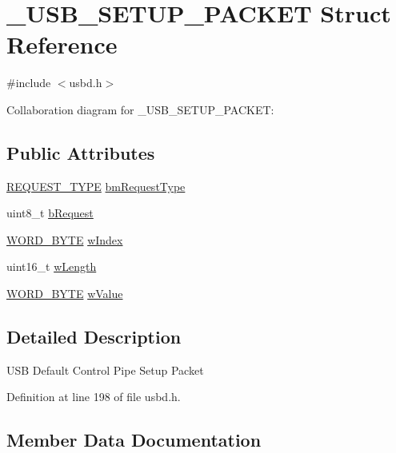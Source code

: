 \hypertarget{struct__USB__SETUP__PACKET}{}\section{\+\_\+\+U\+S\+B\+\_\+\+S\+E\+T\+U\+P\+\_\+\+P\+A\+C\+K\+ET Struct Reference}
\label{struct__USB__SETUP__PACKET}


{\ttfamily \#include $<$usbd.\+h$>$}



Collaboration diagram for \+\_\+\+U\+S\+B\+\_\+\+S\+E\+T\+U\+P\+\_\+\+P\+A\+C\+K\+ET\+:
\subsection*{Public Attributes}
\begin{DoxyCompactItemize}
\item 
\hyperlink{group__USBD__Core_gac85164494feb72445fab7999a3723b6f}{R\+E\+Q\+U\+E\+S\+T\+\_\+\+T\+Y\+PE} \hyperlink{struct__USB__SETUP__PACKET_ac3379b5aabd08a8d980fe8d030f5d6a8}{bm\+Request\+Type}
\item 
uint8\+\_\+t \hyperlink{struct__USB__SETUP__PACKET_a95f462f8491a38e7ee662dcd95d5cb6a}{b\+Request}
\item 
\hyperlink{group__USBD__Core_ga340ec8de2973608b96d5cc7379b9561a}{W\+O\+R\+D\+\_\+\+B\+Y\+TE} \hyperlink{struct__USB__SETUP__PACKET_a1f0ec0c931efe4a96d92b3ceea80b2a3}{w\+Index}
\item 
uint16\+\_\+t \hyperlink{struct__USB__SETUP__PACKET_a2beb83e5854b4a7bc518e5cfbc3f38a6}{w\+Length}
\item 
\hyperlink{group__USBD__Core_ga340ec8de2973608b96d5cc7379b9561a}{W\+O\+R\+D\+\_\+\+B\+Y\+TE} \hyperlink{struct__USB__SETUP__PACKET_a790f014cc1dac6148a182b1cbe24bffe}{w\+Value}
\end{DoxyCompactItemize}


\subsection{Detailed Description}
U\+SB Default Control Pipe Setup Packet 

Definition at line 198 of file usbd.\+h.



\subsection{Member Data Documentation}
